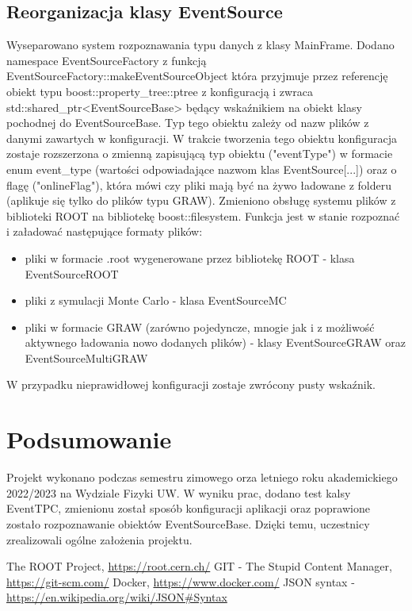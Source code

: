 \documentclass{article}
\begin{document}
\subsection{Reorganizacja klasy EventSource}

Wyseparowano system rozpoznawania typu danych z klasy MainFrame. Dodano namespace EventSourceFactory z funkcją EventSourceFactory::makeEventSourceObject która przyjmuje przez referencję obiekt typu boost::property\_tree::ptree z konfiguracją i zwraca std::shared\_ptr<EventSourceBase> będący wskaźnikiem na obiekt klasy pochodnej do EventSourceBase. Typ tego obiektu zależy od nazw plików z danymi zawartych w konfiguracji. W trakcie tworzenia tego obiektu konfiguracja zostaje rozszerzona o zmienną zapisującą typ obiektu ("eventType") w formacie enum event\_type (wartości odpowiadające nazwom klas EventSource[...]) oraz o flagę ("onlineFlag"), która mówi czy pliki mają być na żywo ładowane z folderu (aplikuje się tylko do plików typu GRAW). Zmieniono obsługę systemu plików z biblioteki ROOT na bibliotekę boost::filesystem. Funkcja jest w stanie rozpoznać i załadować następujące formaty plików:
\begin{itemize}
    \item pliki w formacie .root wygenerowane przez bibliotekę ROOT - klasa EventSourceROOT
    \item pliki z symulacji Monte Carlo - klasa EventSourceMC
    \item pliki w formacie GRAW (zarówno pojedyncze, mnogie jak i z możliwość aktywnego ładowania nowo       dodanych plików) - klasy EventSourceGRAW oraz EventSourceMultiGRAW
\end{itemize}
W przypadku nieprawidłowej konfiguracji zostaje zwrócony pusty wskaźnik.
\section{Podsumowanie}
Projekt wykonano podczas semestru zimowego orza letniego roku akademickiego 2022/2023 na Wydziale Fizyki UW. W wyniku prac, dodano test kalsy EventTPC, zmienionu został sposób konfiguracji aplikacji oraz poprawione zostało rozpoznawanie obiektów EventSourceBase. Dzięki temu, uczestnicy zrealizowali ogólne założenia projektu.

\begin{thebibliography}{99}
        The ROOT Project, \url{https://root.cern.ch/}
        GIT - The Stupid Content Manager, \url{https://git-scm.com/}
        Docker, \url{https://www.docker.com/}
        JSON syntax - \url{https://en.wikipedia.org/wiki/JSON\#Syntax}
\end{thebibliography}
\end{document}
